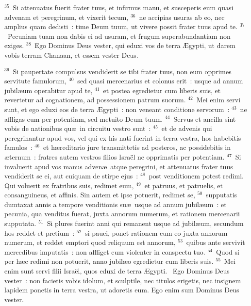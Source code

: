 ${}^{35}$~Si attenuatus fuerit frater tuus, et infirmus manu, et susceperis eum quasi advenam et peregrinum, et vixerit tecum,
${}^{36}$~ne accipias usuras ab eo, nec amplius quam dedisti~: time Deum tuum, ut vivere possit frater tuus apud te.
${}^{37}$~Pecuniam tuam non dabis ei ad usuram, et frugum superabundantiam non exiges.
${}^{38}$~Ego Dominus Deus vester, qui eduxi vos de terra \AE gypti, ut darem vobis terram Chanaan, et essem vester Deus.


${}^{39}$~Si paupertate compulsus vendiderit se tibi frater tuus, non eum opprimes servitute famulorum,
${}^{40}$~sed quasi mercenarius et colonus erit~: usque ad annum jubil\ae um operabitur apud te,
${}^{41}$~et postea egredietur cum liberis suis, et revertetur ad cognationem, ad possessionem patrum suorum.
${}^{42}$~Mei enim servi sunt, et ego eduxi eos de terra \AE gypti~: non veneant conditione servorum~:
${}^{43}$~ne affligas eum per potentiam, sed metuito Deum tuum.
${}^{44}$~Servus et ancilla sint vobis de nationibus qu\ae\ in circuitu vestro sunt~:
${}^{45}$~et de advenis qui peregrinantur apud vos, vel qui ex his nati fuerint in terra vestra, hos habebitis famulos~:
${}^{46}$~et h\ae reditario jure transmittetis ad posteros, ac possidebitis in \ae ternum~: fratres autem vestros filios Isra\"el ne opprimatis per potentiam.
${}^{47}$~Si invaluerit apud vos manus adven\ae\ atque peregrini, et attenuatus frater tuus vendiderit se ei, aut cuiquam de stirpe ejus~:
${}^{48}$~post venditionem potest redimi. Qui voluerit ex fratribus suis, redimet eum,
${}^{49}$~et patruus, et patruelis, et consanguineus, et affinis. Sin autem et ipse potuerit, redimet se,
${}^{50}$~supputatis dumtaxat annis a tempore venditionis su\ae\ usque ad annum jubil\ae um~: et pecunia, qua venditus fuerat, juxta annorum numerum, et rationem mercenarii supputata.
${}^{51}$~Si plures fuerint anni qui remanent usque ad jubil\ae um, secundum hos reddet et pretium~:
${}^{52}$~si pauci, ponet rationem cum eo juxta annorum numerum, et reddet emptori quod reliquum est annorum,
${}^{53}$~quibus ante servivit mercedibus imputatis~: non affliget eum violenter in conspectu tuo.
${}^{54}$~Quod si per h\ae c redimi non potuerit, anno jubil\ae o egredietur cum liberis suis.
${}^{55}$~Mei enim sunt servi filii Isra\"el, quos eduxi de terra \AE gypti.
~\lettrine[lines=10,image=true,loversize=0.05,lraise=-0.03]{E}{}go Dominus Deus vester~: non facietis vobis idolum, et sculptile, nec titulos erigetis, nec insignem lapidem ponetis in terra vestra, ut adoretis eum. Ego enim sum Dominus Deus vester.
